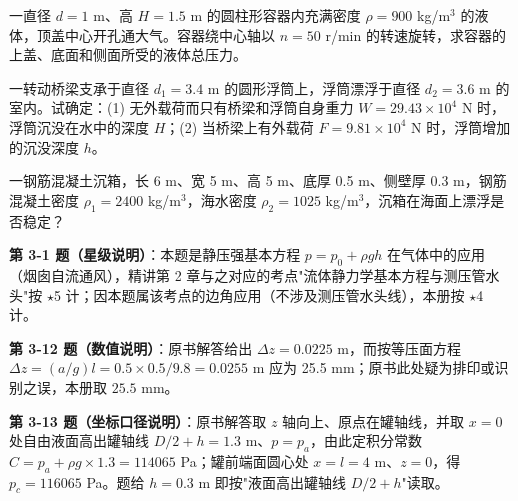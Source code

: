 \begin{ti}
\item[\textbf{3-29}] 一直径 $d=1$ m、高 $H=1.5$ m 的圆柱形容器内充满密度 $\rho=900$ kg/m$^3$ 的液体，顶盖中心开孔通大气。容器绕中心轴以 $n=50$ r/min 的转速旋转，求容器的上盖、底面和侧面所受的液体总压力。
\quad{}\quad{}

\item[\textbf{3-30}] 一转动桥梁支承于直径 $d_1=3.4$ m 的圆形浮筒上，浮筒漂浮于直径 $d_2=3.6$ m 的室内。试确定：(1) 无外载荷而只有桥梁和浮筒自身重力 $W=29.43\times10^4$ N 时，浮筒沉没在水中的深度 $H$；(2) 当桥梁上有外载荷 $F=9.81\times10^4$ N 时，浮筒增加的沉没深度 $h$。
\quad{}\quad{}

\item[\textbf{3-31}] 一钢筋混凝土沉箱，长 6 m、宽 5 m、高 5 m、底厚 0.5 m、侧壁厚 0.3 m，钢筋混凝土密度 $\rho_1=2400$ kg/m$^3$，海水密度 $\rho_2=1025$ kg/m$^3$，沉箱在海面上漂浮是否稳定？
\quad{}\quad{}
\end{ti}

\begin{tishi}
\textbf{第 3-1 题（星级说明）}：本题是静压强基本方程 $p=p_0+\rho gh$ 在气体中的应用（烟囱自流通风），精讲第 2 章与之对应的考点"流体静力学基本方程与测压管水头"按 $\star$5 计；因本题属该考点的边角应用（不涉及测压管水头线），本册按 $\star$4 计。
\end{tishi}

\begin{tishi}
\textbf{第 3-12 题（数值说明）}：原书解答给出 $\Delta z=0.0225$ m，而按等压面方程 $\Delta z=(a/g)l=0.5\times0.5/9.8=0.0255$ m 应为 25.5 mm；原书此处疑为排印或识别之误，本册取 $25.5$ mm。
\end{tishi}

\begin{tishi}
\textbf{第 3-13 题（坐标口径说明）}：原书解答取 $z$ 轴向上、原点在罐轴线，并取 $x=0$ 处自由液面高出罐轴线 $D/2+h=1.3$ m、$p=p_a$，由此定积分常数 $C=p_a+\rho g\times1.3=114065$ Pa；罐前端面圆心处 $x=l=4$ m、$z=0$，得 $p_{c}=116065$ Pa。题给 $h=0.3$ m 即按"液面高出罐轴线 $D/2+h$"读取。
\end{tishi}

